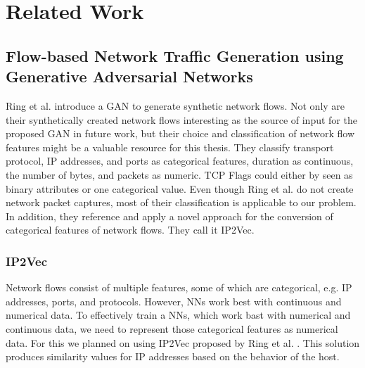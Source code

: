 \documentclass[
	ngerman,
	ruledheaders=section,%
	class=report,%
	thesis={type=bachelor},%
	accentcolor=9c,%
	custommargins=true,%
	marginpar=false,%
	parskip=half-,%
	fontsize=11pt,%
]{tudapub}
\begin{document}
\chapter{Related Work}
\label{sec:relatedWork}


\section{Flow-based Network Traffic Generation using Generative Adversarial Networks}
\label{sec:ringGAN}

Ring et al. \cite{ringFlowbasedNetworkTraffic2019a} introduce a GAN to generate synthetic network flows.
Not only are their synthetically created network flows interesting as the source of input for the proposed GAN in future work,
but their choice and classification of network flow features might be a valuable resource for this thesis.
They classify transport protocol, IP addresses, and ports as categorical features, duration as continuous, the number of bytes, and packets as numeric.
TCP Flags could either by seen as binary attributes or one categorical value.
Even though Ring et al. \cite{ringFlowbasedNetworkTraffic2019a} do not create network packet captures, most of their classification is applicable to our problem.
In addition, they reference and apply a novel approach for the conversion of categorical features of network flows.
They call it IP2Vec.

\subsection{IP2Vec}
\label{sec:IP2Vec}

Network flows consist of multiple features, some of which are categorical, e.g. IP addresses, ports, and protocols.
However, NNs work best with continuous and numerical data.
To effectively train a NNs, which work bast with numerical and continuous data, we need to represent those categorical features as numerical data.
For this we planned on using IP2Vec proposed by Ring et al. \cite{ringIP2VecLearningSimilarities2017}.
This solution produces similarity values for IP addresses based on the behavior of the host.
\end{document}

